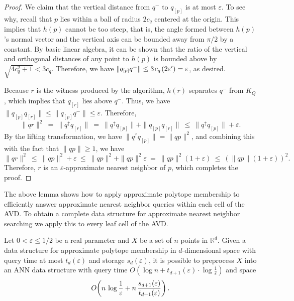 \documentclass[11pt]{article}   \usepackage[letterpaper,hmargin=2.1cm,vmargin=3cm]{geometry}
\newcommand{\RE}{\mathbb{R}}    \newcommand{\ZZ}{\mathbb{Z}}    \newcommand{\eps}{\varepsilon}  \newcommand{\ST}{\,:\,}         \newcommand{\sq}{\square}
\newcommand{\OO}[1]{O\kern-2pt\left(#1\right)}  \newcommand{\half}[1]{\frac{#1}{2}}
\newcommand{\inv}[1]{\frac{1}{#1}}
\renewcommand{\P}{\kern+1pt}    \newcommand{\N}{\kern-2pt}      \newcommand{\NN}{\kern-4pt}     \newcommand{\polar}[1]{\mathrm{polar}(#1)}            \newcommand{\polarX}[2]{\mathrm{polar}_{#1}(#2)}
\begin{document}
\begin{proof}
We claim that the vertical distance from $q^-$ to $q_{[p]}$ is at most $\eps$. To see why, recall that $p$ lies within a ball of radius $2 c_q$ centered at the origin. This implies that $h(p)$ cannot be too steep, that is, the angle formed between $h(p)$'s normal vector and the vertical axis can be bounded away from $\pi/2$ by a constant. By basic linear algebra, it can be shown that the ratio of the vertical and orthogonal distances of any point to $h(p)$ is bounded above by $\sqrt{4 c_q^2 + 1} < 3 c_q$. Therefore, we have $\|q_{[p]} q^-\| \le 3 \P c_q \P (2 \eps') = \eps$, as desired. 

Because $r$ is the witness produced by the algorithm, $h(r)$ separates $q^-$ from $K_Q$, which implies that $q_{[r]}$ lies above $q^-$. Thus, we have $\|q_{[p]} q_{[r]}\| \le \|q_{[p]} q^-\| \le \eps$. Therefore,
\[
	\|q r\|^2
		~  =  ~ \|q^{\uparrow} q_{[r]}\|
		~  =  ~ \|q^{\uparrow} q_{[p]}\| + \|q_{[p]} q_{[r]}\|
		~ \le ~ \|q^{\uparrow} q_{[p]}\| + \eps.
\]
By the lifting transformation, we have $\|q^{\uparrow} q_{[p]}\| = \|q p\|^2$, and combining this with the fact that $\|q p\| \ge 1$, we have
\[
	\|q r\|^2
		~ \le ~ \|q p\|^2 + \eps 
		~ \le ~ \|q p\|^2 + \|q p\|^2 \eps
		~  =  ~ \|q p\|^2 (1 + \eps)
		~ \le ~ \left( \|q p\| (1 + \eps) \right)^2.
\]
Therefore, $r$ is an $\eps$-approximate nearest neighbor of $p$, which completes the proof.
\end{proof}


The above lemma shows how to apply approximate polytope membership to efficiently answer approximate nearest neighbor queries within each cell of the AVD. To obtain a complete data structure for approximate nearest neighbor searching we apply this to every leaf cell of the AVD.

\begin{lemma} \label{lem:reduction}
Let $0 < \eps \leq 1/2$ be a real parameter and $X$ be a set of $n$ points in $\RE^d$. Given a data structure for approximate polytope membership in $d$-dimensional space with query time at most $t_{d}(\eps)$ and storage $s_{d}(\eps)$, it is possible to preprocess $X$ into an ANN data structure with query time $O(\log n + t_{d+1}(\eps) \cdot \log \inv{\eps})$ and space
\[
	\OO{n\,\log\inv{\eps} + n \, \frac{s_{d+1}(\eps)}{t_{d+1}(\eps)}}.
\]
\end{lemma}
\end{document}
